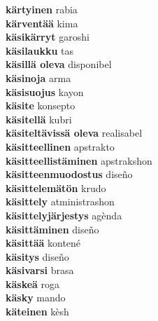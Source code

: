 \textbf{ kärtyinen  } rabia \\
\textbf{ kärventää  } kima \\
\textbf{ käsikärryt  } garoshi \\
\textbf{ käsilaukku  } tas \\
\textbf{ käsillä oleva  } disponibel \\
\textbf{ käsinoja  } arma \\
\textbf{ käsisuojus  } kayon \\
\textbf{ käsite  } konsepto \\
\textbf{ käsitellä  } kubri \\
\textbf{ käsiteltävissä oleva  } realisabel \\
\textbf{ käsitteellinen  } apstrakto \\
\textbf{ käsitteellistäminen  } apstrakshon \\
\textbf{ käsitteenmuodostus  } diseño \\
\textbf{ käsittelemätön  } krudo \\
\textbf{ käsittely  } atministrashon \\
\textbf{ käsittelyjärjestys  } agènda \\
\textbf{ käsittäminen  } diseño \\
\textbf{ käsittää  } kontené \\
\textbf{ käsitys  } diseño \\
\textbf{ käsivarsi  } brasa \\
\textbf{ käskeä  } roga \\
\textbf{ käsky  } mando \\
\textbf{ käteinen  } kèsh \\
